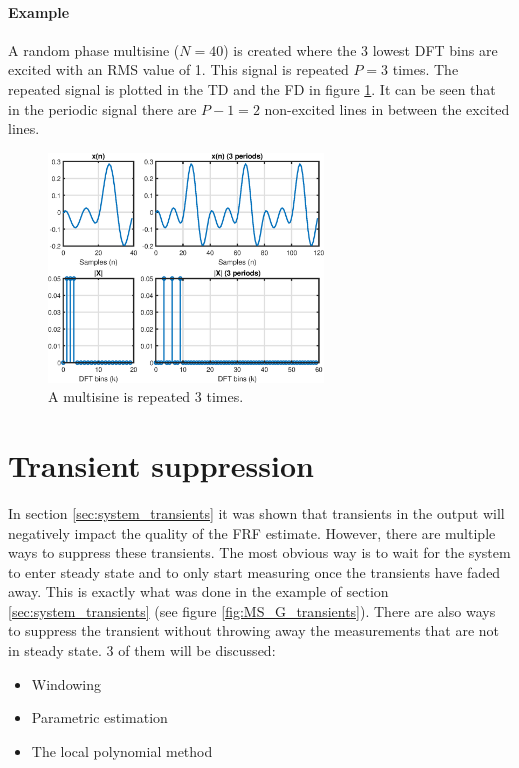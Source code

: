 \newpage
\paragraph{Example}
A random phase multisine ($N=40$) is created where the 3 lowest DFT bins are excited with an RMS value of 1. This signal is repeated $P=3$ times. The repeated signal is plotted in the TD and the FD in figure \ref{fig:periodic_MS}. It can be seen that in the periodic signal there are $P-1 = 2$ non-excited lines in between the excited lines.

\begin{figure}[H]
    \centering
    \includegraphics[width = 0.65\textwidth]{figures/periodic.eps}
    \caption{A multisine is repeated 3 times.}
    \label{fig:periodic_MS}
\end{figure}


\section{Transient suppression}
In section \ref{sec:system_transients} it was shown that transients in the output will negatively impact the quality of the FRF estimate. However, there are multiple ways to suppress these transients. The most obvious way is to wait for the system to enter steady state and to only start measuring once the transients have faded away. This is exactly what was done in the example of section \ref{sec:system_transients} (see figure \ref{fig:MS_G_transients}). There are also ways to suppress the transient without throwing away the measurements that are not in steady state. 3 of them will be discussed:
\begin{itemize}
    \item Windowing
    \item Parametric estimation
    \item The local polynomial method
\end{itemize}

